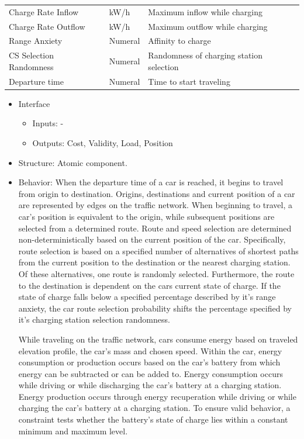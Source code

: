 \begin{table}[h]
\begin{tabular}{lll}
		Charge Rate Inflow                    & kW/h          & Maximum inflow while charging                     \\
		Charge Rate Outflow                   & kW/h          & Maximum outflow while charging                     \\
		Range Anxiety                         & Numeral       & Affinity to charge                     \\
		CS Selection Randomness 			  & Numeral       & Randomness of charging station selection                     \\ 
		Departure time 			  			  & Numeral       & Time to start traveling                    \\ \hline
	\end{tabular}
\end{table}
\begin{itemize}
	\item Interface
	\begin{itemize}
		\item Inputs: -
		\item Outputs: Cost, Validity, Load, Position
	\end{itemize}	
	\item Structure: Atomic component.
	\item Behavior:	When the departure time of a car is reached, it begins to travel from origin to destination. Origins, destinations and current position of a car are represented by edges on the traffic network.  When beginning to travel, a car's position is equivalent to the origin, while subsequent positions are selected from a determined route. Route and speed selection are determined non-deterministically based on the current position of the car. Specifically, route selection is based on a specified number of alternatives of shortest paths from the current position to the destination or the nearest charging station. Of these alternatives, one route is randomly selected. Furthermore, the route to the destination is dependent on the cars current state of charge. If the state of charge falls below a specified percentage described by it's range anxiety, the car route selection probability shifts the percentage specified by it's charging station selection randomness.
	
	While traveling on the traffic network, cars consume energy based on traveled elevation profile, the car's mass and chosen speed. Within the car, energy consumption or production occurs based on the car's battery from which energy can be subtracted or can be added to. Energy consumption occurs while driving or while discharging the car's battery at a charging station. Energy production occurs through energy recuperation while driving or while charging the car's battery at a charging station. To ensure valid behavior, a constraint tests whether the battery's state of charge lies within a constant minimum and maximum level.
	

\end{itemize}
